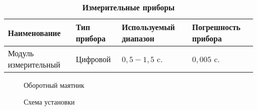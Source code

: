 \documentclass{article}
\begin{document}
\begin{table}[h]
	\caption{\bf Измерительные приборы}
\begin{tabular}[c]{|p{7.5em}|p{7.5em}|p{7.5em}| p{7.5em}|}
	\hline
Наименование & Тип прибора & Используемый диапазон & Погрешность прибора\\\hline
Модуль измерительный& Цифровой&$0{,}5 - 1{,}5$ c.&$ 0{,}005 $ c.\\
\hline
	\end{tabular}
\end{table}


\begin{figure}[h]
	\caption{Оборотный маятник}
\end{figure}

\begin{figure}[h]
	\caption{Схема установки}
\end{figure}
\end{document}
